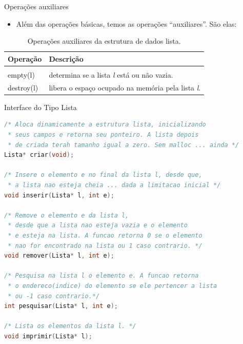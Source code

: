 \begin{frame}{Operações auxiliares}   
	\begin{itemize}
	\item Além das operações básicas, temos as operações ``auxiliares''. São elas:
	\end{itemize}
	\begin{table}[!htpb]
	  \centering
	\begin{tabular}{l||l}
	    \hline \hline 
	 \textbf{Operação} & \textbf{Descrição} \\
	\hline \hline \\
	    \hline empty(l) & determina se a lista \textit{l} está ou não vazia.\\
	    \hline destroy(l) & libera o espaço ocupado na memória pela lista \textit{l}.\\
	    \hline \hline
	\end{tabular}
\caption{Operações auxiliares da estrutura de dados lista.}
\end{table}
 \end{frame}

\begin{frame}{Interface do Tipo Lista}
\footnotesize
\begin{lstlisting}[language=C]
/* Aloca dinamicamente a estrutura lista, inicializando 
 * seus campos e retorna seu ponteiro. A lista depois 
 * de criada terah tamanho igual a zero. Sem malloc ... ainda */
Lista* criar(void);

/* Insere o elemento e no final da lista l, desde que,
 * a lista nao esteja cheia ... dada a limitacao inicial */
void inserir(Lista* l, int e);

/* Remove o elemento e da lista l,
 * desde que a lista nao esteja vazia e o elemento
 * e esteja na lista. A funcao retorna 0 se o elemento 
 * nao for encontrado na lista ou 1 caso contrario. */
void remover(Lista* l, int e);

/* Pesquisa na lista l o elemento e. A funcao retorna 
 * o endereco(indice) do elemento se ele pertencer a lista
 * ou -1 caso contrario.*/
int pesquisar(Lista* l, int e);

/* Lista os elementos da lista l. */
void imprimir(Lista* l);
\end{lstlisting}
\end{frame}

